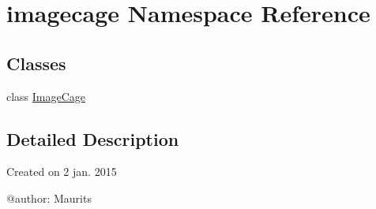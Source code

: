 \hypertarget{namespaceimagecage}{}\section{imagecage Namespace Reference}
\label{namespaceimagecage}
\subsection*{Classes}
\begin{DoxyCompactItemize}
\item 
class \hyperlink{classimagecage_1_1_image_cage}{Image\+Cage}
\end{DoxyCompactItemize}


\subsection{Detailed Description}
\begin{DoxyVerb}Created on 2 jan. 2015

@author: Maurits
\end{DoxyVerb}
 